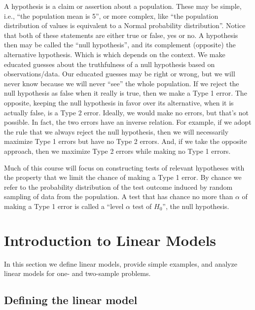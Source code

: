 \documentclass[
]{book}
\begin{document}
A hypothesis is a claim or assertion about a population. These may be simple, i.e., ``the population mean is 5'', or more complex, like ``the population distribution of values is equivalent to a Normal probability distribution''. Notice that both of these statements are either true or false, yes or no. A hypothesis then may be called the ``null hypothesis'', and its complement (opposite) the alternative hypothesis. Which is which depends on the context. We make educated guesses about the truthfulness of a null hypothesis based on observations/data. Our educated guesses may be right or wrong, but we will never know because we will never ``see'' the whole population. If we reject the null hypothesis as false when it really is true, then we make a Type 1 error. The opposite, keeping the null hypothesis in favor over its alternative, when it is actually false, is a Type 2 error. Ideally, we would make no errors, but that's not possible. In fact, the two errors have an inverse relation. For example, if we adopt the rule that we always reject the null hypothesis, then we will necessarily maximize Type 1 errors but have no Type 2 errors. And, if we take the opposite approach, then we maximize Type 2 errors while making no Type 1 errors.

Much of this course will focus on constructing tests of relevant hypotheses with the property that we limit the chance of making a Type 1 error. By chance we refer to the probability distribution of the test outcome induced by random sampling of data from the population. A test that has chance no more than \(\alpha\) of making a Type 1 error is called a ``level \(\alpha\) test of \(H_0\)'', the null hypothesis.

\hypertarget{introduction-to-linear-models}{%
\chapter{Introduction to Linear Models}\label{introduction-to-linear-models}}

In this section we define linear models, provide simple examples, and analyze linear models for one- and two-sample problems.

\hypertarget{defining-the-linear-model}{%
\section{Defining the linear model}\label{defining-the-linear-model}}
\end{document}
